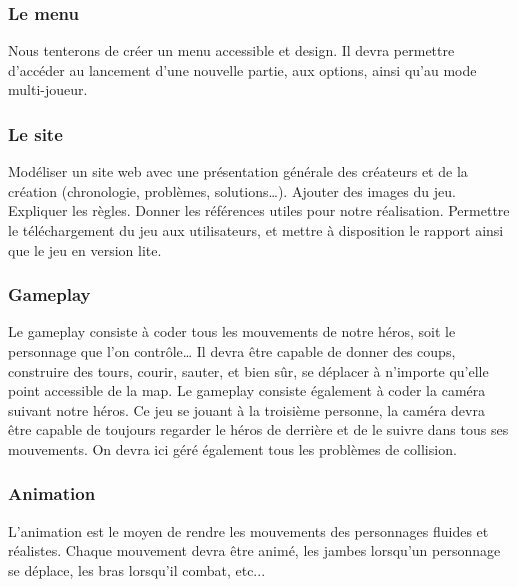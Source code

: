 \documentclass[a4paper, 12pt]{article}
\begin{document}
	\subsubsection{Le menu}
	Nous tenterons de créer un menu accessible et design. Il devra permettre d'accéder au lancement d’une nouvelle partie, aux options, ainsi qu’au mode multi-joueur. 
	\subsubsection{Le site}
	Modéliser un site web avec une présentation générale des créateurs et de la création (chronologie, problèmes, solutions…). Ajouter des images du jeu. Expliquer les règles.  Donner les références utiles pour notre réalisation. Permettre le téléchargement du jeu aux utilisateurs, et mettre à disposition le rapport ainsi que le jeu en version lite.
	\subsubsection{Gameplay}
	Le gameplay consiste à coder tous les mouvements de notre héros, soit le personnage que l’on contrôle… Il devra être capable de donner des coups, construire des tours, courir, sauter, et bien sûr, se déplacer à n’importe qu’elle point accessible de la map. Le gameplay consiste également à coder la caméra suivant notre héros. Ce jeu se jouant à la troisième personne, la caméra devra être capable de toujours regarder le héros de derrière et de le suivre dans tous ses mouvements. On devra ici géré également tous les problèmes de collision.
	\subsubsection{Animation}
	L’animation est le moyen de rendre les mouvements des personnages fluides et réalistes. Chaque mouvement devra être animé, les jambes lorsqu’un personnage se déplace, les bras lorsqu’il combat, etc...

\newpage
\end{document}
